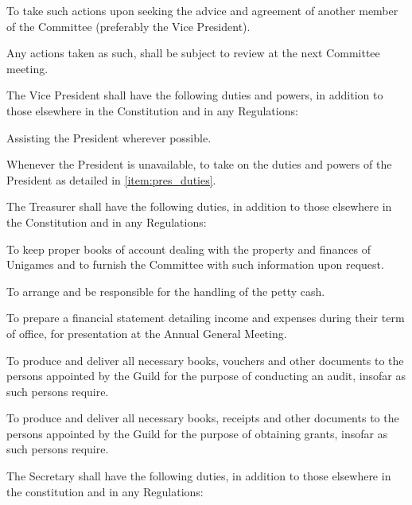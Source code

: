 \documentclass[a4paper]{article}
\begin{document}
\begin{myEnumerate}
\begin{myEnumerate}
                \begin{myEnumerate}
                    \item To take such actions upon seeking the advice and agreement of another member of the Committee (preferably the Vice President).
                    \item Any actions taken as such, shall be subject to review at the next Committee meeting.
                \end{myEnumerate}
        \end{myEnumerate}
    \item The Vice President shall have the following duties and powers, in addition to those elsewhere in the Constitution and in any Regulations:
        \begin{myEnumerate}
            \item Assisting the President wherever possible.
            \item Whenever the President is unavailable, to take on the duties and powers of the President as detailed in \cref{item:pres_duties}.
        \end{myEnumerate}
    \item The Treasurer shall have the following duties, in addition to those elsewhere in the Constitution and in any Regulations:
        \begin{myEnumerate}
            \item To keep proper books of account dealing with the property and finances of Unigames and to furnish the Committee with such information upon request.
            \item To arrange and be responsible for the handling of the petty cash.
            \item To prepare a financial statement detailing income and expenses during their term of office, for presentation at the Annual General Meeting.
            \item To produce and deliver all necessary books, vouchers and other documents to the persons appointed by the Guild for the purpose of conducting an audit, insofar as such persons require.
            \item To produce and deliver all necessary books, receipts and other documents to the persons appointed by the Guild for the purpose of obtaining grants, insofar as such persons require.
        \end{myEnumerate}
    \item The Secretary shall have the following duties, in addition to those elsewhere in the constitution and in any Regulations:

\end{myEnumerate}
\end{document}
